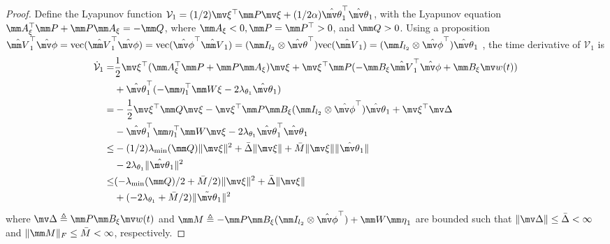\documentclass[letterpaper, 10 pt, conference]{ieeeconf}  %
\begin{document}
\begin{proof}
Define the Lyapunov function $\mathcal V_1=(1/2)\mv\xi^\top \mm P\mv\xi+(1/2\alpha){\hat{\mv\theta}}_1^\top {\hat{\mv\theta}}_1$, with the Lyapunov equation $\mm A_\xi^\top \mm P+\mm P\mm A_\xi=-\mm Q$, where $\mm A_\xi<0,\mm P=\mm P^\top >0$, and $\mm Q>0$.
Using a proposition $\hat {\mm V}_1^\top \hat{\mv\phi} = \text{vec}(\hat {\mm V}_1^\top \hat{\mv\phi})=\text{vec}(\hat{\mv\phi}^\top \hat {\mm V}_1) = (\mm I_{l_2}\otimes {\hat{\mv\theta}}^\top )\text{vec}(\hat {\mm V}_1)=(\mm I_{l_2}\otimes \hat{\mv\phi}^\top ){\hat{\mv\theta}}_1$ \cite[Proposition~(7.1.9)]{Bernstein:2009aa}, the time derivative of $\mathcal V_1$ is
\begin{equation}
    \begin{aligned}
        \dot {\mathcal V}_1 
        =& 
        {1\over 2}
        \mv \xi^\top (\mm A_\xi^\top \mm P+\mm P\mm A_\xi)\mv \xi
        +
        \mv \xi^\top \mm P ( -\mm B_\xi\hat {\mm V}_1^\top \hat {\mv \phi} +\mm B_\xi \mv w(t) )\\
        &
        +{\hat{\mv\theta}}_1^\top 
        (
            -{\mm \eta}_1^\top \mm W \xi-2\lambda_{\theta_1} {\hat{\mv\theta}}_1 
        )
        \\
        =& 
        -{1\over 2}\mv \xi^\top \mm Q\mv \xi 
        -
        \mv \xi^\top \mm P\mm B_\xi(\mm I_{l_2}\otimes \hat{\mv\phi}^\top ){\hat{\mv\theta}}_1 
        +\mv \xi^\top \mv \Delta
        \\
        &
        -{\hat{\mv\theta}}_1^\top {\mm \eta}_1^\top \mm W\mv \xi
        -2\lambda_{\theta_1} {\hat{\mv\theta}}_1^\top {\hat{\mv\theta}}_1
        \\
        \le&
        -(1/2)\lambda_\text{min}(\mm Q)\Vert \mv \xi\Vert ^2
        +\bar\Delta \Vert \mv \xi\Vert  
        +\bar M\Vert \mv \xi\Vert  \Vert {\hat{\mv\theta}}_1\Vert
        \\
        &
        -2\lambda_{\theta_1}
        \Vert{\hat{\mv\theta}}_1\Vert ^2
        \\
        \le& 
        (
        -{\lambda_\text{min}(\mm Q)/ 2} +{\bar M/ 2}
        )
        \Vert \mv \xi\Vert ^2 +\bar\Delta \Vert \mv \xi\Vert  
        \\
        &+ 
        (
        -2\lambda_{\theta_1} 
        +\bar M/ 2
        )
        \Vert \tilde{\mv \theta}_1\Vert ^2 
        \end{aligned}
        \label{eq. lya 1}
\end{equation}
where $\mv \Delta\triangleq \mm P\mm B_\xi \mv w(t)$ and $\mm M\triangleq -\mm P\mm B_\xi(\mm I_{l_2}\otimes \hat{\mv\phi}^\top )+\mm W{\mm \eta}_1$ are bounded such that $\Vert\mv \Delta\Vert\le\bar\Delta<\infty$ and $\Vert\mm M\Vert_F\le \bar M< \infty$, respectively.


\end{proof}
\end{document}
